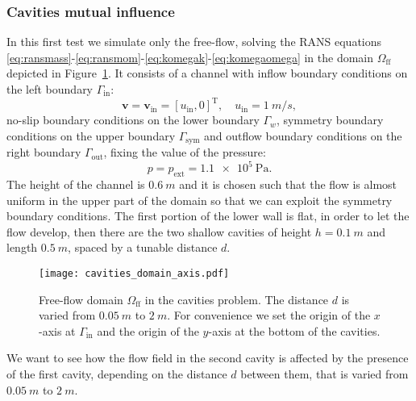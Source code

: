 \subsubsection{Cavities mutual influence}
In this first test we simulate only the free-flow, solving the RANS equations  \eqref{eq:ransmass}-\eqref{eq:ransmom}-\eqref{eq:komegak}-\eqref{eq:komegaomega} in the domain $\Omega_\text{ff}$ depicted in Figure~\ref{fig:singledomain}. It consists of a channel with inflow boundary 
conditions on the left boundary $\Gamma_\text{in}$:
\begin{equation}
	\mathbf{v} = \mathbf{v}_\text{in} = [u_\text{in}, 0]^\mathrm{T}, \quad u_\text{in} = \SI{1}{m/s},
\end{equation}
no-slip boundary conditions on the lower boundary $\Gamma_w$, symmetry boundary conditions on the upper boundary $\Gamma_\text{sym}$ and outflow boundary conditions on the right boundary $\Gamma_\text{out}$, fixing the value of the pressure:
\begin{equation}
	p = p_\text{ext} = \SI{1.1e5}{\pascal}.
\end{equation}
The height of the channel is $\SI{0.6}{m}$ and it is chosen such that the flow is almost uniform in the upper part of the domain so that we can exploit the symmetry boundary conditions. The first portion of the lower wall is flat, in order to let the flow develop, then there are the two shallow cavities of height $h=\SI{0.1}{m}$ and length $\SI{0.5}{m}$, spaced by a tunable distance $d$.
\begin{figure}[ht]
	\centering
	\texttt{[image: cavities\_domain\_axis.pdf]}
	\caption[Free-flow domain $\Omega_\text{ff}$ in the cavities problem]{Free-flow domain $\Omega_\text{ff}$ in the cavities problem. The distance $d$ is varied from $\SI{0.05}{m}$ to $\SI{2}{m}$. For convenience we set the origin of the $x$-axis at $\Gamma_\text{in}$ and the origin of the $y$-axis at the bottom of the cavities.}
	\label{fig:singledomain}
\end{figure}

We want to see how the flow field in the second cavity is affected by the 
presence of the first cavity, depending on the distance $d$ between them, that 
is varied from $\SI{0.05}{m}$ to $\SI{2}{m}$.

